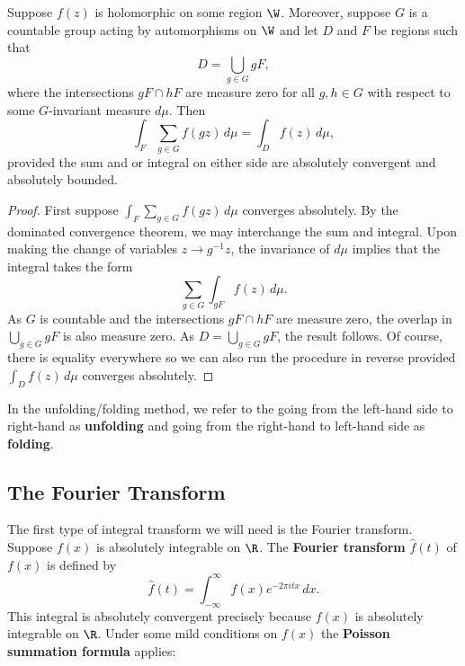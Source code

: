         \begin{theorem}
          Suppose $f(z)$ is holomorphic on some region $\W$. Moreover, suppose $G$ is a countable group acting by automorphisms on $\W$ and let $D$ and $F$ be regions such that
          \[
            D = \bigcup_{g \in G}gF,
          \]
          where the intersections $gF \cap hF$ are measure zero for all $g,h \in G$ with respect to some $G$-invariant measure $d\mu$. Then 
          \[
            \int_{F}\sum_{g \in G}f(g z)\,d\mu = \int_{D}f(z)\,d\mu,
          \]
          provided the sum and or integral on either side are absolutely convergent and absolutely bounded.
        \end{theorem}
        \begin{proof}
          First suppose $\int_{F}\sum_{g \in G}f(g z)\,d\mu$ converges absolutely. By the dominated convergence theorem, we may interchange the sum and integral. Upon making the change of variables $z \to g^{-1}z$, the invariance of $d\mu$ implies that the integral takes the form
          \[
            \sum_{g \in G}\int_{gF}f(z)\,d\mu.
          \]
          As $G$ is countable and the intersections $gF \cap hF$ are measure zero, the overlap in $\bigcup_{g \in G}gF$ is also measure zero. As $D = \bigcup_{g \in G}gF$, the result follows. Of course, there is equality everywhere so we can also run the procedure in reverse provided $\int_{D}f(z)\,d\mu$ converges absolutely.
        \end{proof}

        In the unfolding/folding method, we refer to the going from the left-hand side to right-hand as \textbf{unfolding} and going from the right-hand to left-hand side as \textbf{folding}.
      \subsection*{The Fourier Transform}
        The first type of integral transform we will need is the Fourier transform. Suppose $f(x)$ is absolutely integrable on $\R$. The \textbf{Fourier transform} $\hat{f}(t)$ of $f(x)$ is defined by
        \[
          \hat{f}(t) = \int_{-\infty}^{\infty}f(x)e^{-2\pi itx}\,dx.
        \]
        This integral is absolutely convergent precisely because $f(x)$ is absolutely integrable on $\R$. Under some mild conditions on $f(x)$ the \textbf{Poisson summation formula} applies:

